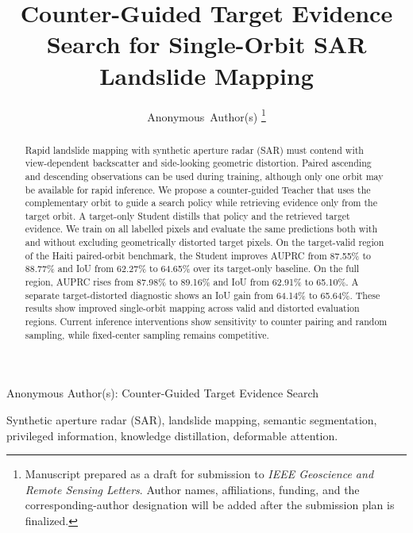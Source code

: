 \documentclass[journal]{IEEEtran}
\begin{document}
\title{Counter-Guided Target Evidence Search for Single-Orbit SAR Landslide Mapping}

\author{Anonymous~Author(s)%
\thanks{Manuscript prepared as a draft for submission to \emph{IEEE Geoscience and Remote Sensing Letters}. Author names, affiliations, funding, and the corresponding-author designation will be added after the submission plan is finalized.}}

%
{Anonymous Author(s): Counter-Guided Target Evidence Search}

\maketitle

\begin{abstract}
Rapid landslide mapping with synthetic aperture radar (SAR) must contend with view-dependent backscatter and side-looking geometric distortion. Paired ascending and descending observations can be used during training, although only one orbit may be available for rapid inference. We propose a counter-guided Teacher that uses the complementary orbit to guide a search policy while retrieving evidence only from the target orbit. A target-only Student distills that policy and the retrieved target evidence. We train on all labelled pixels and evaluate the same predictions both with and without excluding geometrically distorted target pixels. On the target-valid region of the Haiti paired-orbit benchmark, the Student improves AUPRC from 87.55\% to 88.77\% and IoU from 62.27\% to 64.65\% over its target-only baseline. On the full region, AUPRC rises from 87.98\% to 89.16\% and IoU from 62.91\% to 65.10\%. A separate target-distorted diagnostic shows an IoU gain from 64.14\% to 65.64\%. These results show improved single-orbit mapping across valid and distorted evaluation regions. Current inference interventions show sensitivity to counter pairing and random sampling, while fixed-center sampling remains competitive.
\end{abstract}

\begin{IEEEkeywords}
Synthetic aperture radar (SAR), landslide mapping, semantic segmentation, privileged information, knowledge distillation, deformable attention.
\end{IEEEkeywords}






\FloatBarrier
\balance

{\scriptsize


}
\end{document}
